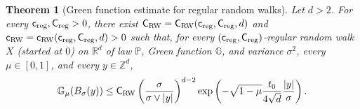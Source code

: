 \documentclass[11pt,a4paper]{article}
\numberwithin{equation}{section}
\theoremstyle{plain}
\newtheorem{Thm}{Theorem}[section]
\theoremstyle{definition}
\newcommand\1{\mathds{1}}
\newcommand\Crw{\mathsf{C}_{\textup{RW}}}
\newcommand\crw{\mathsf{c}_{\textup{RW}}}
\newcommand\CM{\mathsf{C}_{\textup{reg}}}
\newcommand\cM{\mathsf{c}_{\textup{reg}}}
\begin{document}
\begin{Thm}[Green function estimate for regular random walks]
\label{thm:estimate RW-app}
Let $d>2$.
For every $\cM,\CM>0$, there exist $\mathsf{C}_{\textup{RW}}=\Crw(\cM,\CM,d)$ and $\crw=\crw(\cM,\CM,d)>0$ such that, for every $(\cM,\CM)$-regular random walk $X$ (started at $0$) on $\mathbb R^d$ of law $\mathbb P$,
Green function $\mathbb G$, and variance $\sigma^2$, every $\mu \in [0,1]$, and every $y\in \mathbb Z^d$,
	\begin{equation}
\label{eq:Green function regular walk}
		\mathbb G_\mu (B_\sigma(y))
    \leq \Crw\left(\frac{\sigma}{\sigma\vee |y|}\right)^{d-2} \exp\left(-\sqrt{1-\mu}\frac{t_0}{4\sqrt{d}}\frac{|y|}{\sigma}\right) .
	\end{equation}
\end{Thm}
\end{document}
